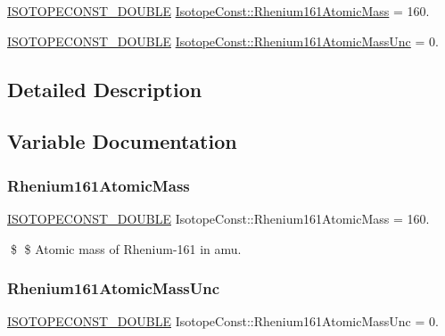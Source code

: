 \begin{DoxyCompactItemize}
\item 
\mbox{\hyperlink{group___isotope_const-_macros_ga8f45a7272ce02c0b4c65c44636ed719a}{I\+S\+O\+T\+O\+P\+E\+C\+O\+N\+S\+T\+\_\+\+D\+O\+U\+B\+LE}} \mbox{\hyperlink{group___isotope_const-_rhenium-_re161_gaa4ee011c3cd23a029eba4e3809ec1ec6}{Isotope\+Const\+::\+Rhenium161\+Atomic\+Mass}} = 160.
\item 
\mbox{\hyperlink{group___isotope_const-_macros_ga8f45a7272ce02c0b4c65c44636ed719a}{I\+S\+O\+T\+O\+P\+E\+C\+O\+N\+S\+T\+\_\+\+D\+O\+U\+B\+LE}} \mbox{\hyperlink{group___isotope_const-_rhenium-_re161_ga54fa1ca58ea390d98fa0905d019c76b2}{Isotope\+Const\+::\+Rhenium161\+Atomic\+Mass\+Unc}} = 0.
\end{DoxyCompactItemize}


\subsection{Detailed Description}


\subsection{Variable Documentation}
\mbox{\label{group___isotope_const-_rhenium-_re161_gaa4ee011c3cd23a029eba4e3809ec1ec6}} 
\subsubsection{\texorpdfstring{Rhenium161\+Atomic\+Mass}{Rhenium161AtomicMass}}
{\footnotesize\ttfamily \mbox{\hyperlink{group___isotope_const-_macros_ga8f45a7272ce02c0b4c65c44636ed719a}{I\+S\+O\+T\+O\+P\+E\+C\+O\+N\+S\+T\+\_\+\+D\+O\+U\+B\+LE}} Isotope\+Const\+::\+Rhenium161\+Atomic\+Mass = 160.}

\$ \$ Atomic mass of Rhenium-\/161 in amu. \mbox{\label{group___isotope_const-_rhenium-_re161_ga54fa1ca58ea390d98fa0905d019c76b2}} 
\subsubsection{\texorpdfstring{Rhenium161\+Atomic\+Mass\+Unc}{Rhenium161AtomicMassUnc}}
{\footnotesize\ttfamily \mbox{\hyperlink{group___isotope_const-_macros_ga8f45a7272ce02c0b4c65c44636ed719a}{I\+S\+O\+T\+O\+P\+E\+C\+O\+N\+S\+T\+\_\+\+D\+O\+U\+B\+LE}} Isotope\+Const\+::\+Rhenium161\+Atomic\+Mass\+Unc = 0.}

